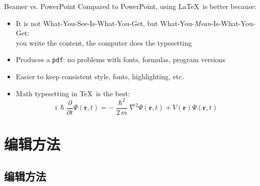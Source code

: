 \documentclass{sintefbeamer}
\begin{document}
\begin{frame}{Beamer vs. PowerPoint}
Compared to PowerPoint, using \LaTeX\ is better because:
\begin{itemize}
\item It is not What-You-See-Is-What-You-Get, but
What-You-\emph{Mean}-Is-What-You-Get:\\
you write the content, the computer does the typesetting
\item Produces a \texttt{pdf}: no problems with fonts, formulas,
      program versions
\item Easier to keep consistent style, fonts, highlighting, etc.
\item Math typesetting in \TeX\ is the best:
\begin{equation*}
\mathrm{i}\,\hslash\frac{\partial}{\partial t} \Psi(\mathbf{r},t) =
-\frac{\hslash^2}{2\,m}\nabla^2\Psi(\mathbf{r},t)
+ V(\mathbf{r})\Psi(\mathbf{r},t)
\end{equation*}

\end{itemize}
\end{frame}

\section{编辑方法}

\subsection{编辑方法}

\end{document}
